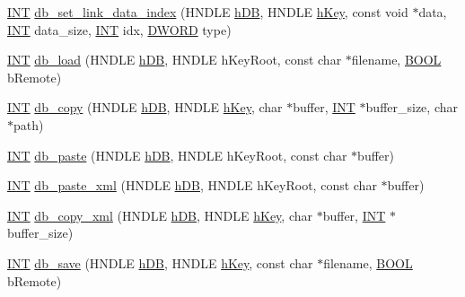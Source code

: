\begin{DoxyCompactItemize}
\item 
\hyperlink{vppg_8h_a392e62da233ed3e2f7c3fd4f487a3896}{INT} \hyperlink{group__odbfunctionc_gac66c3264c78ef6cc1e429235efe92ed6}{db\_\-set\_\-link\_\-data\_\-index} (HNDLE \hyperlink{mevb_8c_ab1f60c53f74e806a3b9f687af38d7421}{hDB}, HNDLE \hyperlink{mevb_8c_a8cd567d23219ba7fc83280cf20caf1c2}{hKey}, const void $\ast$data, \hyperlink{vppg_8h_a392e62da233ed3e2f7c3fd4f487a3896}{INT} data\_\-size, \hyperlink{vppg_8h_a392e62da233ed3e2f7c3fd4f487a3896}{INT} idx, \hyperlink{vt2_8h_a798af1e30bc65f319c1a246cecf59e39}{DWORD} type)
\item 
\hyperlink{vppg_8h_a392e62da233ed3e2f7c3fd4f487a3896}{INT} \hyperlink{group__odbfunctionc_ga437034642fc8851bfa67937635cb7d12}{db\_\-load} (HNDLE \hyperlink{mevb_8c_ab1f60c53f74e806a3b9f687af38d7421}{hDB}, HNDLE hKeyRoot, const char $\ast$filename, \hyperlink{vt2_8h_a239c7f0d40651c3e419c5b9651507d14}{BOOL} bRemote)
\item 
\hyperlink{vppg_8h_a392e62da233ed3e2f7c3fd4f487a3896}{INT} \hyperlink{group__odbfunctionc_ga165f2428c082852ff2ac1e8c4c78d607}{db\_\-copy} (HNDLE \hyperlink{mevb_8c_ab1f60c53f74e806a3b9f687af38d7421}{hDB}, HNDLE \hyperlink{mevb_8c_a8cd567d23219ba7fc83280cf20caf1c2}{hKey}, char $\ast$buffer, \hyperlink{vppg_8h_a392e62da233ed3e2f7c3fd4f487a3896}{INT} $\ast$buffer\_\-size, char $\ast$path)
\item 
\hyperlink{vppg_8h_a392e62da233ed3e2f7c3fd4f487a3896}{INT} \hyperlink{group__odbfunctionc_gac1bf8d648ef2ddb1ac6243e5e11dedf2}{db\_\-paste} (HNDLE \hyperlink{mevb_8c_ab1f60c53f74e806a3b9f687af38d7421}{hDB}, HNDLE hKeyRoot, const char $\ast$buffer)
\item 
\hyperlink{vppg_8h_a392e62da233ed3e2f7c3fd4f487a3896}{INT} \hyperlink{group__odbfunctionc_ga7b0051acf49620e36823f55b907dda7a}{db\_\-paste\_\-xml} (HNDLE \hyperlink{mevb_8c_ab1f60c53f74e806a3b9f687af38d7421}{hDB}, HNDLE hKeyRoot, const char $\ast$buffer)
\item 
\hyperlink{vppg_8h_a392e62da233ed3e2f7c3fd4f487a3896}{INT} \hyperlink{group__odbfunctionc_ga9fcec4712c44e1ef199297aad9ea99c5}{db\_\-copy\_\-xml} (HNDLE \hyperlink{mevb_8c_ab1f60c53f74e806a3b9f687af38d7421}{hDB}, HNDLE \hyperlink{mevb_8c_a8cd567d23219ba7fc83280cf20caf1c2}{hKey}, char $\ast$buffer, \hyperlink{vppg_8h_a392e62da233ed3e2f7c3fd4f487a3896}{INT} $\ast$buffer\_\-size)
\item 
\hyperlink{vppg_8h_a392e62da233ed3e2f7c3fd4f487a3896}{INT} \hyperlink{group__odbfunctionc_ga6f9a61b316a1c2a5c9c143fc84edf63b}{db\_\-save} (HNDLE \hyperlink{mevb_8c_ab1f60c53f74e806a3b9f687af38d7421}{hDB}, HNDLE \hyperlink{mevb_8c_a8cd567d23219ba7fc83280cf20caf1c2}{hKey}, const char $\ast$filename, \hyperlink{vt2_8h_a239c7f0d40651c3e419c5b9651507d14}{BOOL} bRemote)

\end{DoxyCompactItemize}
